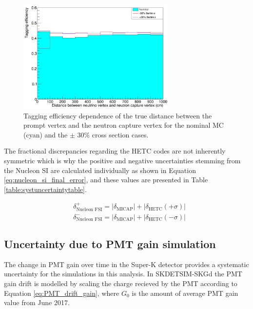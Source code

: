 \begin{figure}[!htb]
\centering
    \includegraphics[width=0.7\textwidth]{Figures/hetc_han_syst.PNG}
\caption{Tagging efficiency dependence of the true distance between the prompt vertex and the neutron capture vertex for the nominal MC (cyan) and the $\pm$ 30\% cross section cases.}
\label{fig:HETC_taggeff_syst}
\end{figure}

The fractional discrepancies regarding the HETC codes are not inherently symmetric which is why the positive and negative uncertainties stemming from the Nucleon SI are calculated individually as shown in Equation \ref{eq:nucleon_si_final_error}, and these values are presented in Table \ref{table:systuncertaintytable}.

\begin{equation}
    \begin{aligned}
    & \delta_{\text{Nucleon FSI}}^{+}=\left|\delta_{\text{MICAP}}\right|+\left|\delta_{\text {HETC}}(+\sigma)\right| \\
    & \delta_{\text{Nucleon FSI}}^{-}=\left|\delta_{\text {MICAP}}\right|+\left|\delta_{\text {HETC}}(-\sigma)\right|
    \end{aligned}
    \label{eq:nucleon_si_final_error}
\end{equation}


\subsection{Uncertainty due to PMT gain simulation}

The change in PMT gain over time in the Super-K detector provides a systematic uncertainty for the simulations in this analysis. In SKDETSIM-SKGd the PMT gain drift is modelled by scaling the charge recieved by the PMT according to Equation \ref{eq:PMT_drift_gain}, where $G_{0}$ is the amount of average PMT gain value from June 2017. 

